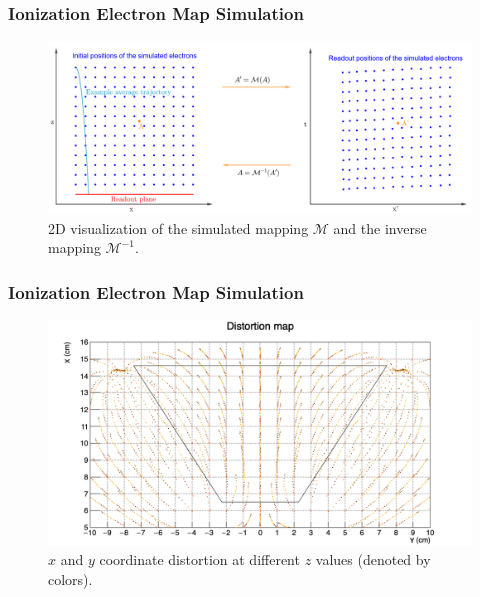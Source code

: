 \documentclass{beamer}
\begin{document}
	\begin{frame}
		\frametitle{Ionization Electron Map Simulation}
		\begin{figure}
			\centering
			\includegraphics[width=\textwidth]{../images/map_visualization_big.png}
			\small{2D visualization of the simulated mapping $\mathcal{M}$ and the inverse mapping $\mathcal{M}^{-1}$.}
		\end{figure}
	\end{frame}
	\begin{frame}
		\frametitle{Ionization Electron Map Simulation}
		\begin{figure}
			\centering
			\includegraphics[height=0.68\textheight]{../images/map_dist.png}\\
			\small{$x$ and $y$ coordinate distortion at different $z$ values (denoted by colors).}
		\end{figure}
	\end{frame}
\end{document}
